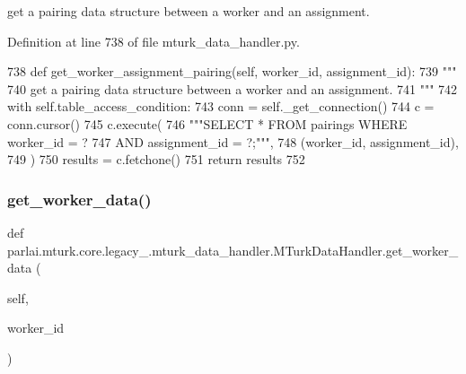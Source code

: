 \begin{DoxyVerb}get a pairing data structure between a worker and an assignment.
\end{DoxyVerb}
 

Definition at line 738 of file mturk\+\_\+data\+\_\+handler.\+py.


\begin{DoxyCode}
738     \textcolor{keyword}{def }get\_worker\_assignment\_pairing(self, worker\_id, assignment\_id):
739         \textcolor{stringliteral}{"""}
740 \textcolor{stringliteral}{        get a pairing data structure between a worker and an assignment.}
741 \textcolor{stringliteral}{        """}
742         with self.table\_access\_condition:
743             conn = self.\_get\_connection()
744             c = conn.cursor()
745             c.execute(
746                 \textcolor{stringliteral}{"""SELECT * FROM pairings WHERE worker\_id = ?}
747 \textcolor{stringliteral}{                         AND assignment\_id = ?;"""},
748                 (worker\_id, assignment\_id),
749             )
750             results = c.fetchone()
751             \textcolor{keywordflow}{return} results
752 
\end{DoxyCode}
\mbox{\label{classparlai_1_1mturk_1_1core_1_1legacy__2018_1_1mturk__data__handler_1_1MTurkDataHandler_aaaee48085add1dcdca33b9e3c41c3444}} 
\subsubsection{\texorpdfstring{get\+\_\+worker\+\_\+data()}{get\_worker\_data()}}
{\footnotesize\ttfamily def parlai.\+mturk.\+core.\+legacy\+\_.\+mturk\+\_\+data\+\_\+handler.\+M\+Turk\+Data\+Handler.\+get\+\_\+worker\+\_\+data (\begin{DoxyParamCaption}\item[{}]{self,  }\item[{}]{worker\+\_\+id }\end{DoxyParamCaption})}

